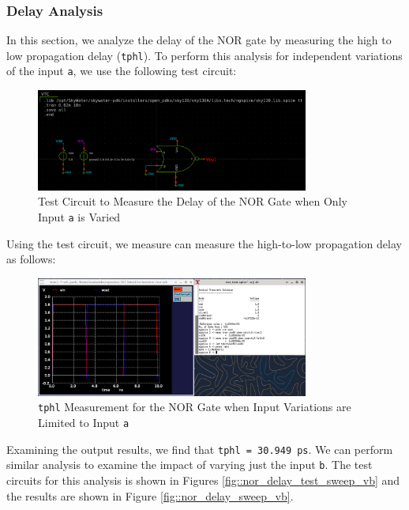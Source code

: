 \documentclass[fleqn]{article}
\begin{document}
	\subsubsection{Delay Analysis}
	
	In this section, we analyze the delay of the NOR gate by measuring the high to low propagation delay (\texttt{tphl}). To perform this analysis for independent variations of the input \texttt{a}, we use the following test circuit:
	
	\begin{figure}[H]
		\centerline{\includegraphics[width=0.8\textwidth]{nor_delay_test_sweep_va.png}}
		\caption{Test Circuit to Measure the Delay of the NOR Gate when Only Input \texttt{a} is Varied}
		\label{fig::nor_delay_test_sweep_va}
	\end{figure}
	
	Using the test circuit, we measure can measure the high-to-low propagation delay as follows:
	
	\begin{figure}[H]
		\centerline{\includegraphics[width=0.8\textwidth]{nor_delay_sweep_va.png}}
		\caption{\texttt{tphl} Measurement for the NOR Gate when Input Variations are Limited to Input \texttt{a}}
		\label{fig::nor_delay_sweep_va}
	\end{figure}
	
	Examining the output results, we find that \texttt{tphl = 30.949 ps}. We can perform similar analysis to examine the impact of varying just the input \texttt{b}. The test circuits for this analysis is shown in Figures \ref{fig::nor_delay_test_sweep_vb} and the results are shown in Figure \ref{fig::nor_delay_sweep_vb}.
	
\end{document}
